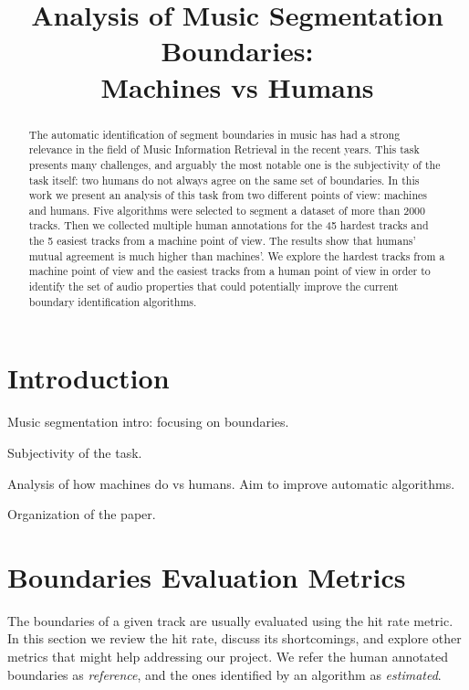 \documentclass{article}
\title{Analysis of Music Segmentation Boundaries:\\ Machines vs Humans}
\begin{document}
%
\maketitle
%
\begin{abstract}
  The automatic identification of segment boundaries in music has had a strong relevance in the field of Music Information Retrieval in the recent years.
  This task presents many challenges, and arguably the most notable one is the subjectivity of the task itself: two humans do not always agree on the same set of boundaries.
  In this work we present an analysis of this task from two different points of view: machines and humans.
  Five algorithms were selected to segment a dataset of more than 2000 tracks.
  Then we collected multiple human annotations for the 45 hardest tracks and the 5 easiest tracks from a machine point of view.
  The results show that humans' mutual agreement is much higher than machines'.
  We explore the hardest tracks from a machine point of view and the easiest tracks from a human point of view in order to identify the set of audio properties that could potentially improve the current boundary identification algorithms.
  
\end{abstract}
%
\section{Introduction}\label{sec:introduction}

Music segmentation intro: focusing on boundaries.

Subjectivity of the task.

Analysis of how machines do vs humans. Aim to improve automatic algorithms.

Organization of the paper.

\section{Boundaries Evaluation Metrics}

The boundaries of a given track are usually evaluated using the hit rate metric.
In this section we review the hit rate, discuss its shortcomings, and explore other metrics that might help addressing our project.
We refer the human annotated boundaries as \emph{reference}, and the ones identified by an algorithm as \emph{estimated}.
\end{document}
